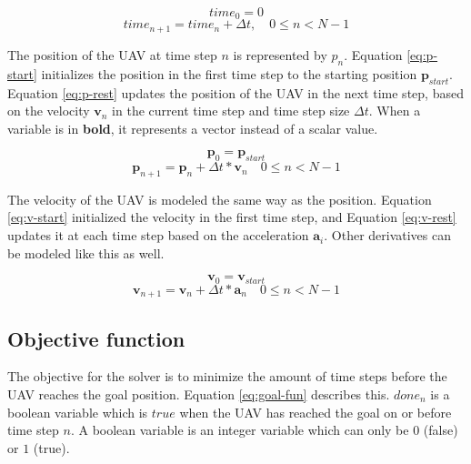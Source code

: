 \begin{equation}
\label{eq:t-start}
time_0 = 0
\end{equation}
\begin{equation}
\label{eq:t-rest}
time_{n+1} = time_{n} + \Delta t,  \quad 0 \leq n < N - 1
\end{equation}

The position of the UAV at time step $n$ is represented by $p_n$. Equation \ref{eq:p-start} initializes the position in the first time step to the starting position $\boldsymbol{p}_{start}$. Equation \ref{eq:p-rest} updates the position of the UAV in the next time step, based on the velocity $\boldsymbol{v}_n$ in the current time step and time step size $\Delta t$. When a variable is in \textbf{bold}, it represents a vector instead of a scalar value.

\begin{equation}
\label{eq:p-start}
\boldsymbol{p}_0 = \boldsymbol{p}_{start}
\end{equation}
\begin{equation}
\label{eq:p-rest}
\boldsymbol{p}_{n+1} = \boldsymbol{p}_{n} + \Delta t * \boldsymbol{v}_{n}  \quad 0 \leq n < N - 1
\end{equation}

The velocity of the UAV is modeled the same way as the position. Equation \ref{eq:v-start} initialized the velocity in the first time step, and Equation \ref{eq:v-rest} updates it at each time step based on the acceleration $\boldsymbol{a}_i$. Other derivatives can be modeled like this as well.

\begin{equation}
\label{eq:v-start}
\boldsymbol{v}_0 =\boldsymbol{v}_{start}
\end{equation}
\begin{equation}
\label{eq:v-rest}
\boldsymbol{v}_{n+1} =\boldsymbol{v}_{n} + \Delta t * \boldsymbol{a}_{n}  \quad 0 \leq n < N - 1
\end{equation}

\subsection{Objective function}
The objective for the solver is to minimize the amount of time steps before the UAV reaches the goal position. Equation \ref{eq:goal-fun} describes this. $done_n$ is a boolean variable which is $true$ when the UAV has reached the goal on or before time step $n$. A boolean variable is an integer variable which can only be $0$ (false) or $1$ (true).


